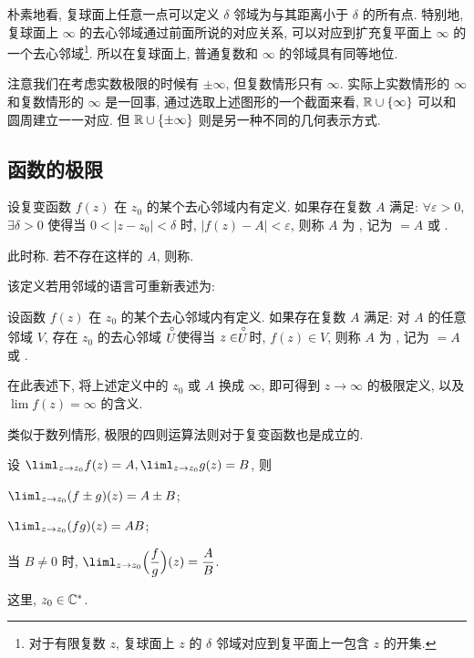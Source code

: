 朴素地看, 复球面上任意一点可以定义 $\delta$ 邻域为与其距离小于 $\delta$ 的所有点.
特别地, 复球面上 $\infty$ 的去心邻域通过前面所说的对应关系, 可以对应到扩充复平面上 $\infty$ 的一个去心邻域\footnote{
  对于有限复数 $z$, 复球面上 $z$ 的 $\delta$ 邻域对应到复平面上一包含 $z$ 的开集.
}.
所以在复球面上, 普通复数和 $\infty$ 的邻域具有同等地位.

注意我们在考虑实数极限的时候有 $\pm\infty$, 但复数情形只有 $\infty$.
实际上实数情形的 $\infty$ 和复数情形的 $\infty$ 是一回事, 通过选取上述图形的一个截面来看, ${\mathbb{R}}\cup\{\infty\}$ 可以和圆周建立一一对应.
但 ${\mathbb{R}}\cup\{\pm\infty\}$ 则是另一种不同的几何表示方式.



\subsection{函数的极限}

\begin{definition}
  设复变函数 $f(z)$ 在 $z_0$ 的某个去心邻域内有定义.
  如果存在复数 $A$ 满足: $\forall\varepsilon>0$, $\exists \delta>0$ 使得当 $0<|z-z_0|<\delta$ 时, $|f(z)-A|<\varepsilon$, 则称 $A$ 为 , 记为 $=A$ 或 .
\end{definition}
此时称.
若不存在这样的 $A$, 则称.

该定义若用邻域的语言可重新表述为:
\begin{definition}
  设函数 $f(z)$ 在 $z_0$ 的某个去心邻域内有定义.
  如果存在复数 $A$ 满足: 对 $A$ 的任意邻域 $V$, 存在 $z_0$ 的去心邻域 $\stackrel{\circ}{U}\!\!$ 使得当 $z\in\stackrel{\circ}{U}\!\!$ 时, $f(z)\in V$, 则称 $A$ 为 , 记为 $=A$ 或 .
\end{definition}
在此表述下, 将上述定义中的 $z_0$ 或 $A$ 换成 $\infty$, 即可得到 $z\to\infty$ 的极限定义, 以及 $\lim f(z)=\infty$ 的含义.

类似于数列情形, 极限的四则运算法则对于复变函数也是成立的.
\begin{theorem}\label{thm:limfunctionfour}
  设 $\liml_{z\to z_0}f(z)=A,\liml_{z\to z_0}g(z)=B$, 则
  \begin{enumpar}
    \item $\liml_{z\to z_0}(f\pm g)(z)=A\pm B$;
    \item $\liml_{z\to z_0}(fg)(z)=AB$;
    \item 当 $B\neq 0$ 时, $\liml_{z\to z_0}\Bigl(\dfrac fg\Bigr)(z)=\dfrac AB$.
  \end{enumpar}
  这里, $z_0\in{\mathbb{C}}^*$.
\end{theorem}

